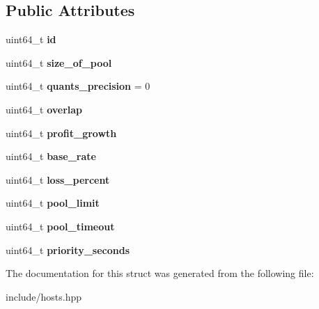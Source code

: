 \subsection*{Public Attributes}
\begin{DoxyCompactItemize}
\item 
\mbox{\label{structeosio_1_1spiral_a61ebae8c25f7c4c7d2be72d6f0fed5d8}} 
uint64\+\_\+t {\bfseries id}
\item 
\mbox{\label{structeosio_1_1spiral_a4123371627ed960eb1e09aa20329b2be}} 
uint64\+\_\+t {\bfseries size\+\_\+of\+\_\+pool}
\item 
\mbox{\label{structeosio_1_1spiral_a42a102c54cbc120bbed56ceda9fa1545}} 
uint64\+\_\+t {\bfseries quants\+\_\+precision} = 0
\item 
\mbox{\label{structeosio_1_1spiral_a090332a0c0025c7f7b51ab7d5f584b48}} 
uint64\+\_\+t {\bfseries overlap}
\item 
\mbox{\label{structeosio_1_1spiral_afed09ff5d3c6e80424341af4b3372a7c}} 
uint64\+\_\+t {\bfseries profit\+\_\+growth}
\item 
\mbox{\label{structeosio_1_1spiral_a1b8837ba326a7721c76d4da43ead9702}} 
uint64\+\_\+t {\bfseries base\+\_\+rate}
\item 
\mbox{\label{structeosio_1_1spiral_a494dfca6774c6f9d48f30969aef69510}} 
uint64\+\_\+t {\bfseries loss\+\_\+percent}
\item 
\mbox{\label{structeosio_1_1spiral_a3516f19930c6fa349e5ca00e9a120a17}} 
uint64\+\_\+t {\bfseries pool\+\_\+limit}
\item 
\mbox{\label{structeosio_1_1spiral_ac7590a527bb272afbbeca356b56e4ca0}} 
uint64\+\_\+t {\bfseries pool\+\_\+timeout}
\item 
\mbox{\label{structeosio_1_1spiral_a7095d64ee94ecb91926d3a191ae80dcf}} 
uint64\+\_\+t {\bfseries priority\+\_\+seconds}
\end{DoxyCompactItemize}


The documentation for this struct was generated from the following file\+:\begin{DoxyCompactItemize}
\item 
include/hosts.\+hpp\end{DoxyCompactItemize}
